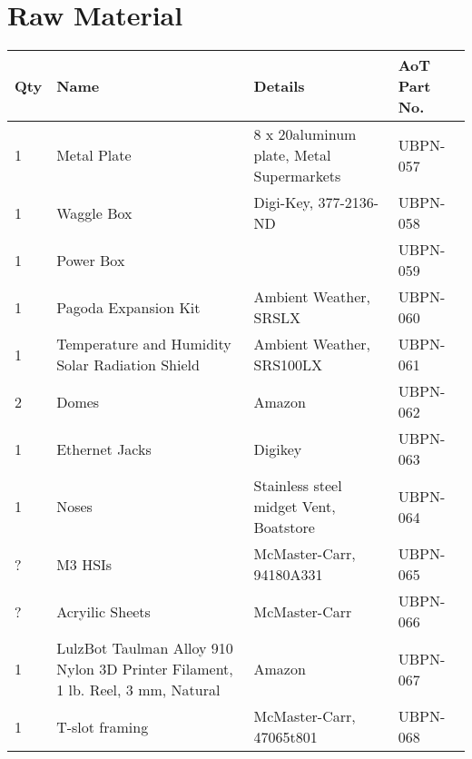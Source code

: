\section{Raw Material}
\begin{longtable}{|p{}|p{}|p{}|p{}|}
\hline
\textbf{Qty} & \textbf{Name} & \textbf{Details} & \textbf{AoT Part No.} \\ \hline
1 & Metal Plate & 8 x 20aluminum plate, Metal Supermarkets & UBPN-057\\ \hline
1 & Waggle Box & Digi-Key, 377-2136-ND & UBPN-058\\ \hline
1 & Power Box &  & UBPN-059\\ \hline
1 & Pagoda Expansion Kit & Ambient Weather, SRSLX & UBPN-060\\ \hline
1 & Temperature and Humidity Solar Radiation Shield & Ambient Weather, SRS100LX & UBPN-061\\ \hline
2 & Domes & Amazon & UBPN-062\\ \hline
1 & Ethernet Jacks & Digikey & UBPN-063\\ \hline
1 & Noses & Stainless steel midget Vent, Boatstore & UBPN-064\\ \hline
? & M3 HSIs & McMaster-Carr, 94180A331 & UBPN-065\\ \hline
? & Acryilic Sheets & McMaster-Carr & UBPN-066\\ \hline
1 & LulzBot Taulman Alloy 910 Nylon 3D Printer Filament, 1 lb. Reel, 3 mm, Natural & Amazon & UBPN-067\\ \hline
1 & T-slot framing & McMaster-Carr, 47065t801 & UBPN-068\\ \hline
\end{longtable}


